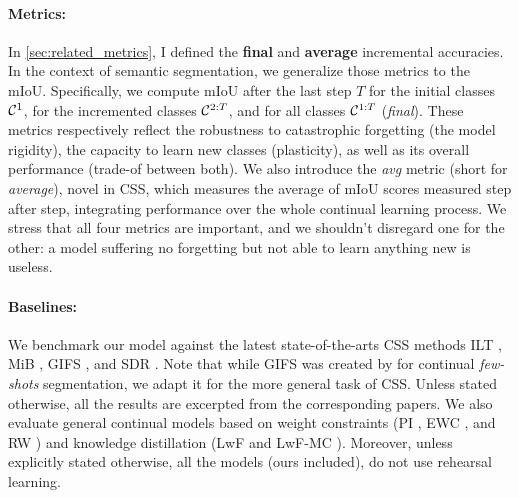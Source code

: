 \paragraph{Metrics:} In \autoref{sec:related_metrics}, I defined the \textbf{final} and
\textbf{average} incremental accuracies. In the context of semantic segmentation, we generalize
those metrics to the \acf{mIoU}. Specifically, we compute \ac{mIoU} after the last step $T$ for the
initial classes $\mathcal{C}^{1}$, for the incremented classes $\mathcal{C}^{2:T}$, and for all classes
$\mathcal{C}^{1:T}$ (\textit{final}). These metrics respectively reflect the robustness to catastrophic
forgetting (the model rigidity), the capacity to learn new classes (plasticity), as well as its
overall performance (trade-of between both). We also introduce the \textit{avg} metric (short for
\textit{average}), novel in \ac{CSS}, which measures the average of \ac{mIoU} scores measured step
after step, integrating performance over the whole continual learning process. We stress that all
four metrics are important, and we shouldn't disregard one for the other: a model suffering no
forgetting but not able to learn anything new is useless.



\paragraph{Baselines:} We benchmark our model against the latest state-of-the-arts \ac{CSS}
methods ILT \citep{michieli2019ilt}, MiB \citep{cermelli2020modelingthebackground}, GIFS
\citep{cermelli2020fewshotcontinualsegm}, and SDR \citep{michieli2021sdr}. Note that while GIFS was
created by \cite{cermelli2020fewshotcontinualsegm} for continual \textit{few-shots}
segmentation, we adapt it for the more general task of \ac{CSS}. Unless stated otherwise, all the results
are excerpted from the corresponding papers. We also evaluate general continual models based on
weight constraints (PI \citep{zenke2017synaptic_intelligence}, EWC \citep{kirkpatrick2017ewc}, and RW
\citep{chaudhry2018riemannien_walk}) and knowledge distillation (LwF \citep{li2018lwf} and LwF-MC
\citep{rebuffi2017icarl}). Moreover, unless explicitly stated otherwise, all the models (ours
included), do not use rehearsal learning.


